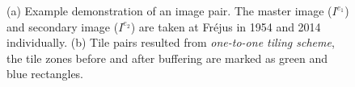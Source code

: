 \begin{figure}[htbp]
	\begin{center}
		\caption{(a) Example demonstration of an image pair. The master image ($I^{e_1}$) and secondary image ($I^{e_2}$) are taken at Fr{\'e}jus in 1954 and 2014 individually. (b) Tile pairs resulted from \textit{one-to-one tiling scheme}, the tile zones before and after buffering are marked as green and blue rectangles.}
		\label{patchexample}
	\end{center}
\end{figure}

